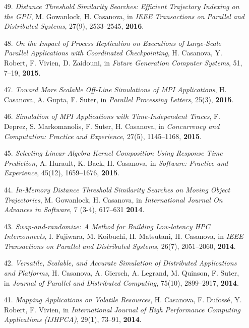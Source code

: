 \begin{enumerate}
\item [49.] {\it Distance Threshold Similarity Searches: Efficient
Trajectory Indexing on the GPU}, M. Gowanlock, H. Casanova, in \emph{IEEE
Transactions on Parallel and Distributed Systems}, 27(9), 2533--2545, {\bf 2016}.

\item [48.] {\it On the Impact of Process Replication on Executions of Large-Scale Parallel Applications with Coordinated Checkpointing},
H. Casanova, Y. Robert, F. Vivien, D. Zaidouni, in \emph{ Future Generation
Computer Systems}, 51, 7--19, {\bf 2015}.

\item [47.] {\it Toward More Scalable Off-Line Simulations of MPI Applications}, H. Casanova, A. Gupta, F. Suter, in \emph{Parallel Processing Letters}, 25(3), {\bf 2015}.

\item [46.] {\it Simulation of MPI Applications with Time-Independent Traces},
F. Deprez, S. Markomanolis, F. Suter, H. Casanova,
in \emph{Concurrency and Computation: Practice and Experience},
27(5), 1145--1168, {\bf 2015}.

\item [45.] {\it Selecting Linear Algebra Kernel Composition Using Response
Time Prediction}, A. Hurault, K. Baek, H. Casanova, in \emph{Software:
Practice and Experience}, 45(12), 1659--1676, {\bf 2015}.

\item [44.] {\it In-Memory Distance Threshold Similarity Searches on Moving
Object Trajectories}, M. Gowanlock, H. Casanova, in \emph{International
Journal On Advances in Software},  7 (3-4), 617--631 {\bf 2014}.

\item [43.] {\it Swap-and-randomize: A Method for Building Low-latency HPC Interconnects}, I. Fujiwara, M. Koibuchi, H. Matsutani, H. Casanova,
    in \emph{IEEE Transactions on Parallel and Distributed Systems}, 26(7),  2051--2060,  {\bf 2014}.

\item [42.] {\it Versatile, Scalable, and Accurate Simulation of Distributed Applications and Platforms},
H. Casanova, A. Giersch, A. Legrand, M. Quinson, F. Suter,
in \emph{Journal of Parallel and Distributed Computing},
75(10), 2899--2917, {\bf 2014}.

\item [41.] {\it Mapping Applications on Volatile Resources},
H. Casanova, F. Dufoss\'e, Y. Robert, F. Vivien,
in \emph{International Journal of High Performance Computing Applications (IJHPCA)}, 29(1), 73--91, {\bf 2014}.


\end{enumerate}

